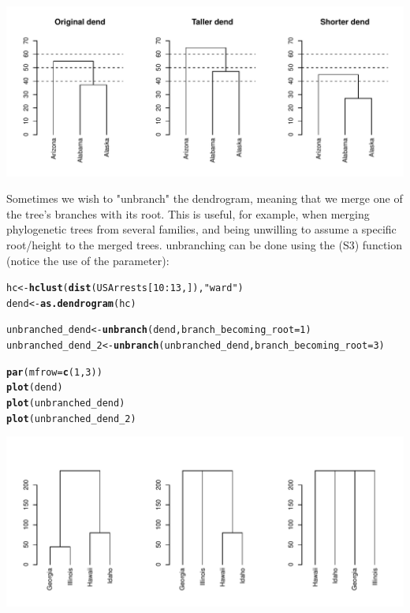 \documentclass[shortnames,nojss,article]{jss}\usepackage[]{graphicx}\usepackage[]{color}
\makeatletter
\def\maxwidth{ %
  \ifdim\Gin@nat@width>\linewidth
    \linewidth
  \else
    \Gin@nat@width
  \fi
}
\newcommand{\hlnum}[1]{\textcolor[rgb]{0.686,0.059,0.569}{#1}}%
\newcommand{\hlstr}[1]{\textcolor[rgb]{0.192,0.494,0.8}{#1}}%
\newcommand{\hlopt}[1]{\textcolor[rgb]{0,0,0}{#1}}%
\newcommand{\hlstd}[1]{\textcolor[rgb]{0.345,0.345,0.345}{#1}}%
\newcommand{\hlkwb}[1]{\textcolor[rgb]{0.69,0.353,0.396}{#1}}%
\newcommand{\hlkwc}[1]{\textcolor[rgb]{0.333,0.667,0.333}{#1}}%
\newcommand{\hlkwd}[1]{\textcolor[rgb]{0.737,0.353,0.396}{\textbf{#1}}}%
\newenvironment{kframe}{%
 \def\at@end@of@kframe{}%
 \ifinner\ifhmode%
  \def\at@end@of@kframe{\end{minipage}}%
  \begin{minipage}{\columnwidth}%
 \fi\fi%
 \def\FrameCommand##1{\hskip\@totalleftmargin \hskip-\fboxsep
 \colorbox{shadecolor}{##1}\hskip-\fboxsep
     \hskip-\linewidth \hskip-\@totalleftmargin \hskip\columnwidth}%
 \MakeFramed {\advance\hsize-\width
   \@totalleftmargin\z@ \linewidth\hsize
   \@setminipage}}%
 {\par\unskip\endMakeFramed%
 \at@end@of@kframe}
\newenvironment{knitrout}{}{} %
\makeatother
\begin{document}
\begin{knitrout}
{\centering \includegraphics[width=\maxwidth]{figure/unnamed-chunk-23} 

}



\end{knitrout}




Sometimes we wish to "unbranch" the dendrogram, meaning that we merge one of the tree's branches with its root. This is useful, for example, when merging phylogenetic trees from several families, and being unwilling to assume a specific root/height to the merged trees. unbranching can be done using the  (S3) function (notice the use of the  parameter):


\begin{knitrout}
\color{fgcolor}\begin{kframe}
\begin{alltt}
\hlstd{hc} \hlkwb{<-} \hlkwd{hclust}\hlstd{(}\hlkwd{dist}\hlstd{(USArrests[}\hlnum{10}\hlopt{:}\hlnum{13}\hlstd{, ]),} \hlstr{"ward"}\hlstd{)}
\hlstd{dend} \hlkwb{<-} \hlkwd{as.dendrogram}\hlstd{(hc}\hlstd{)}

\hlstd{unbranched_dend} \hlkwb{<-} \hlkwd{unbranch}\hlstd{(dend,} \hlkwc{branch_becoming_root} \hlstd{=} \hlnum{1}\hlstd{)}
\hlstd{unbranched_dend_2} \hlkwb{<-} \hlkwd{unbranch}\hlstd{(unbranched_dend,} \hlkwc{branch_becoming_root} \hlstd{=} \hlnum{3}\hlstd{)}

\hlkwd{par}\hlstd{(}\hlkwc{mfrow} \hlstd{=} \hlkwd{c}\hlstd{(}\hlnum{1}\hlstd{,} \hlnum{3}\hlstd{))}
\hlkwd{plot}\hlstd{(dend)}
\hlkwd{plot}\hlstd{(unbranched_dend)}
\hlkwd{plot}\hlstd{(unbranched_dend_2)}
\end{alltt}
\end{kframe}

{\centering \includegraphics[width=\maxwidth]{figure/unnamed-chunk-24} 

}



\end{knitrout}
\end{document}
